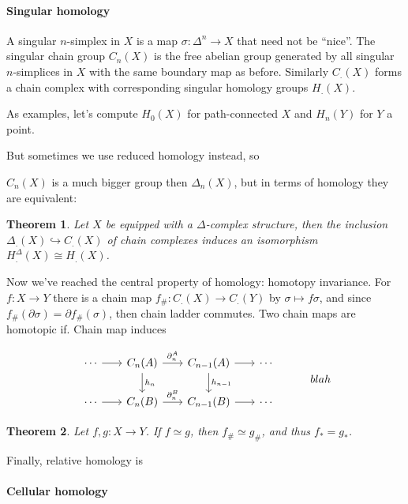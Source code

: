 \documentclass[11pt]{article}
\theoremstyle{definition}
\theoremstyle{plain}
\newtheorem{theorem}{Theorem}[section]
\begin{document}
\paragraph{Singular homology}

A singular $n$-simplex in $X$ is a map $\sigma:\Delta^n\to X$ that need not be ``nice''. The singular chain group $C_n(X)$ is the free abelian group generated by all singular $n$-simplices in $X$ with the same boundary map as before. Similarly $C_.(X)$ forms a chain complex with corresponding singular homology groups $H_.(X)$.\medbreak

As examples, let's compute $H_0(X)$ for path-connected $X$ and $H_n(Y)$ for $Y$ a point.\medbreak

But sometimes we use reduced homology instead, so\medbreak

$C_n(X)$ is a much bigger group then $\Delta_n(X)$, but in terms of homology they are equivalent:

\begin{theorem}
Let $X$ be equipped with a $\Delta$-complex structure, then the inclusion $\Delta_.(X)\hookrightarrow C_.(X)$ of chain complexes induces an isomorphism $H_.^\Delta(X)\cong H_.(X)$.
\end{theorem}

Now we've reached the central property of homology: homotopy invariance. For $f:X\to Y$ there is a chain map $f_\#:C_.(X)\to C_.(Y)$ by $\sigma\mapsto f\sigma$, and since $f_\#(\partial\sigma)=\partial f_\#(\sigma)$, then chain ladder commutes. Two chain maps are homotopic if. Chain map induces 

\[\begin{tikzcd}[column sep=scriptsize]
\cdots\arrow{r}&C_n(A)\arrow{d}{h_n}\arrow{r}{\partial_n^A}&C_{n-1}(A)\arrow{d}{h_{n-1}}\arrow{r}&\cdots\\
\cdots\arrow{r}&C_n(B)\arrow{r}{\partial_n^B}&C_{n-1}(B)\arrow{r}&\cdots
\end{tikzcd}\quad\quad\quad blah\]

\begin{theorem}
Let $f,g:X\to Y$. If $f\simeq g$, then $f_\#\simeq g_\#$, and thus $f_\ast=g_\ast$.
\end{theorem}

Finally, relative homology is

\paragraph{Cellular homology}
\end{document}
